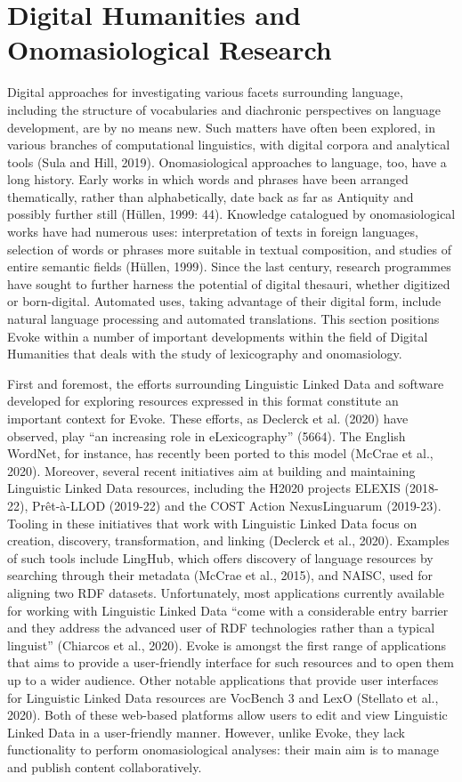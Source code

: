 \section{Digital Humanities and Onomasiological Research}

Digital approaches for investigating various facets surrounding language, including the structure of vocabularies and diachronic perspectives on language development, are by no means new. Such matters have often been explored, in various branches of computational linguistics, with digital corpora and analytical tools (Sula and Hill, 2019). Onomasiological approaches to language, too, have a long history. Early works in which words and phrases have been arranged thematically, rather than alphabetically, date back as far as Antiquity and possibly further still (Hüllen, 1999: 44). Knowledge catalogued by onomasiological works have had numerous uses: interpretation of texts in foreign languages, selection of words or phrases more suitable in textual composition, and studies of entire semantic fields (Hüllen, 1999).  Since the last century, research programmes have sought to further harness the potential of digital thesauri, whether digitized or born-digital. Automated uses, taking advantage of their digital form, include natural language processing and automated translations.  This section positions Evoke within a number of important developments within the field of Digital Humanities that deals with the study of lexicography and onomasiology.

First and foremost, the efforts surrounding Linguistic Linked Data and software developed for exploring resources expressed in this format constitute an important context for Evoke. These efforts, as Declerck et al. (2020) have observed, play “an increasing role in eLexicography” (5664). The English WordNet, for instance, has recently been ported to this model (McCrae et al., 2020). Moreover, several recent initiatives aim at building and maintaining Linguistic Linked Data resources, including the H2020 projects ELEXIS (2018-22), Prêt-à-LLOD (2019-22) and the COST Action NexusLinguarum (2019-23).  Tooling in these initiatives that work with Linguistic Linked Data focus on creation, discovery, transformation, and linking (Declerck et al., 2020). Examples of such tools include LingHub, which offers discovery of language resources by searching through their metadata (McCrae et al., 2015), and NAISC, used for aligning two RDF datasets.  Unfortunately, most applications currently available for working with Linguistic Linked Data “come with a considerable entry barrier and they address the advanced user of RDF technologies rather than a typical linguist” (Chiarcos et al., 2020). Evoke is amongst the first range of applications that aims to provide a user-friendly interface for such resources and to open them up to a wider audience. Other notable applications that provide user interfaces for Linguistic Linked Data resources are VocBench 3 and LexO (Stellato et al., 2020). Both of these web-based platforms allow users to edit and view Linguistic Linked Data in a user-friendly manner. However, unlike Evoke, they lack functionality to perform onomasiological analyses: their main aim is to manage and publish content collaboratively.

